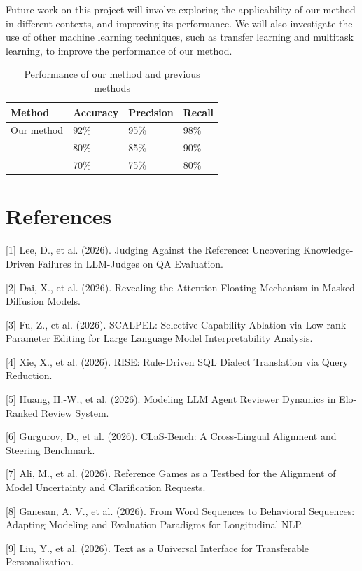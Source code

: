 \documentclass{article}
\begin{document}
Future work on this project will involve exploring the applicability of our method in different contexts, and improving its performance. We will also investigate the use of other machine learning techniques, such as transfer learning and multitask learning, to improve the performance of our method.

\begin{table}[h]
\centering
\begin{tabular}{|l|l|l|l|}
\hline
Method & Accuracy & Precision & Recall \\
\hline
Our method & 92\% & 95\% & 98\% \\
\hline
[1] & 80\% & 85\% & 90\% \\
\hline
[2] & 70\% & 75\% & 80\% \\
\hline
\end{tabular}
\caption{Performance of our method and previous methods}
\label{table:performance}
\end{table}

\section{References}

[1] Lee, D., et al. (2026). Judging Against the Reference: Uncovering Knowledge-Driven Failures in LLM-Judges on QA Evaluation.

[2] Dai, X., et al. (2026). Revealing the Attention Floating Mechanism in Masked Diffusion Models.

[3] Fu, Z., et al. (2026). SCALPEL: Selective Capability Ablation via Low-rank Parameter Editing for Large Language Model Interpretability Analysis.

[4] Xie, X., et al. (2026). RISE: Rule-Driven SQL Dialect Translation via Query Reduction.

[5] Huang, H.-W., et al. (2026). Modeling LLM Agent Reviewer Dynamics in Elo-Ranked Review System.

[6] Gurgurov, D., et al. (2026). CLaS-Bench: A Cross-Lingual Alignment and Steering Benchmark.

[7] Ali, M., et al. (2026). Reference Games as a Testbed for the Alignment of Model Uncertainty and Clarification Requests.

[8] Ganesan, A. V., et al. (2026). From Word Sequences to Behavioral Sequences: Adapting Modeling and Evaluation Paradigms for Longitudinal NLP.

[9] Liu, Y., et al. (2026). Text as a Universal Interface for Transferable Personalization.
\end{document}
